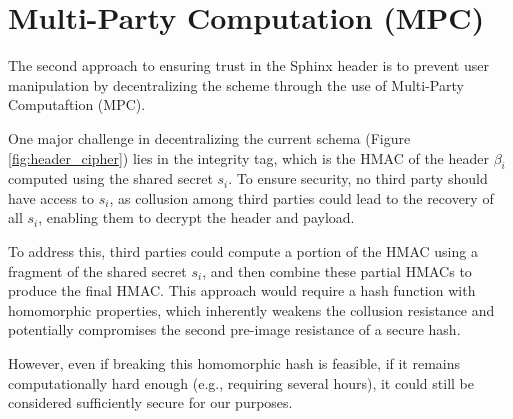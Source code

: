 \section{Multi-Party Computation (MPC)}

The second approach to ensuring trust in the Sphinx header is to prevent user manipulation by decentralizing the scheme through the use of Multi-Party Computaftion (MPC).


One major challenge in decentralizing the current schema (Figure \ref{fig:header_cipher}) lies in the integrity tag, which is the HMAC of the header $\beta_i$ computed using the shared secret $s_i$. To ensure security, no third party should have access to $s_i$, as collusion among third parties could lead to the recovery of all $s_i$, enabling them to decrypt the header and payload.

To address this, third parties could compute a portion of the HMAC using a fragment of the shared secret $s_i$, and then combine these partial HMACs to produce the final HMAC. This approach would require a hash function with homomorphic properties, which inherently weakens the collusion resistance and potentially compromises the second pre-image resistance of a secure hash.

However, even if breaking this homomorphic hash is feasible, if it remains computationally hard enough (e.g., requiring several hours), it could still be considered sufficiently secure for our purposes.